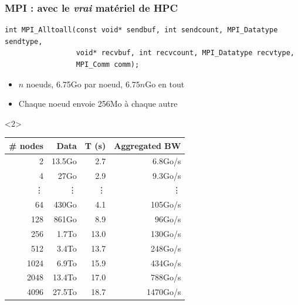 \documentclass[xcolor={x11names,svgnames}]{beamer}
\begin{document}
\begin{frame}[fragile]
\frametitle{MPI : avec le \emph{vrai} matériel de HPC}

\begin{verbatim}
int MPI_Alltoall(const void* sendbuf, int sendcount, MPI_Datatype sendtype,
                 void* recvbuf, int recvcount, MPI_Datatype recvtype,
                 MPI_Comm comm);
\end{verbatim}

\begin{itemize}  
\item $n$ noeuds, 6.75Go par noeud, $6.75n$Go en tout
\item Chaque noeud envoie 256Mo à chaque autre
\end{itemize}

\bigskip

\footnotesize
\begin{overlayarea}{\textwidth}{5cm}
  \centering
  
  \begin{onlyenv}<2>
    \begin{tabular}{|r|r|r|r|}
  \hline
  \# nodes & Data             & T (s)        & Aggregated BW \\
  \hline\hline
  2        & 13.5Go           & 2.7      & 6.8Go/s \\
  4        & 27Go             & 2.9      & 9.3Go/s \\
    \vdots & \vdots           & \vdots   & \vdots  \\                                         
  64       & 430Go            & 4.1      & 105Go/s \\
  128      & 861Go            & 8.9      &  96Go/s \\
  256      & 1.7To            & 13.0     & 130Go/s \\
  512      & 3.4To            & 13.7     & 248Go/s \\
  1024     & 6.9To            & 15.9     & 434Go/s \\
  2048     & 13.4To           & 17.0     & 788Go/s \\
  4096     & 27.5To           & 18.7     & 1470Go/s \\
    \hline
    \end{tabular}
  \end{onlyenv}
\end{overlayarea}

\end{frame}
\end{document}
